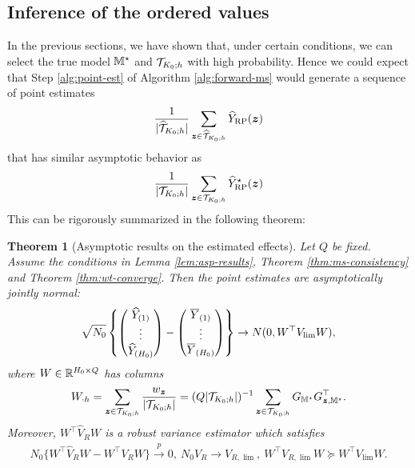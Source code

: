 \documentclass[12pt]{article}
\newtheorem{theorem}{Theorem}
\begin{document}
\subsection{Inference of the ordered values}

In the previous sections, we have shown that, under certain conditions, we can select the true model ${\mathbb{M}}^\star$ and ${\mathcal{T}}_{K_0;h}$ with high probability. Hence we could expect that Step \ref{alg:point-est} of Algorithm \ref{alg:forward-ms} would generate a sequence of point estimates 
\begin{align*}
    \frac{1}{|\widehat{{\mathcal{T}}}_{K_0;h}|} \sum_{{\boldsymbol{z}}\in \widehat{{\mathcal{T}}}_{K_0;h}} {\widehat{Y}}_{\operatorname{RP}}({\boldsymbol{z}})
\end{align*}
that has similar asymptotic behavior as
\begin{align*}
    \frac{1}{|{{\mathcal{T}}}_{K_0;h}|} \sum_{{\boldsymbol{z}}\in {{\mathcal{T}}}_{K_0;h}} {\widehat{Y}}_{\operatorname{RP}}^\star({\boldsymbol{z}})
\end{align*}
This can be rigorously summarized in the following theorem:

\begin{theorem}[Asymptotic results on the estimated effects]\label{thm:infer-order}
Let $Q$ be fixed. Assume the conditions in Lemma \ref{lem:asp-results}, Theorem \ref{thm:ms-consistency} and Theorem \ref{thm:wt-converge}. Then the point estimates are asymptotically jointly normal:
\begin{align*}
        \sqrt{N_0}\left\{
        \begin{pmatrix}
        {\widehat{Y}}_{(1)}\\
        \vdots \\
        {\widehat{Y}}_{(H_0)}
        \end{pmatrix}
        - 
        \begin{pmatrix}
        \overline{Y}_{(1)}\\
        \vdots \\
        \overline{Y}_{(H_0)}
        \end{pmatrix} 
        \right\} \to N(0, W^\top V_{\lim} W),
\end{align*}
where $W\in{\mathbb{R}}^{H_0 \times Q}$ has columns
\begin{align*}
    W_{\cdot h} = \sum_{{\boldsymbol{z}}\in {{\mathcal{T}}}_{K_0;h}}\frac{w_{{\boldsymbol{z}}}}{|{{\mathcal{T}}}_{K_0;h}|} = (Q|{{\mathcal{T}}}_{K_0;h}|)^{-1}\sum_{{\boldsymbol{z}}\in {{\mathcal{T}}}_{K_0;h}}G_{{\mathbb{M}}^\star} G_{{\boldsymbol{z}}, {\mathbb{M}}^\star}^\top .
\end{align*}
Moreover, $W^\top \hat{V}_R W$ is a robust variance estimator which satisfies
\begin{align*}
    {N_0} \{W^\top \hat{V}_R W - W^\top {V}_R W\} \xrightarrow{p} 0, ~ N_0 V_{R} \to V_{R,\lim}, ~ W^\top V_{R,\lim} W \succeq W^\top V_{\lim} W.
\end{align*}

\end{theorem}
\end{document}
